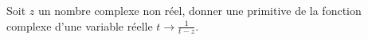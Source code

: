 Soit $z$ un nombre complexe non r{\'e}el, donner une primitive de la fonction complexe d'une variable r{\'e}elle $t\longrightarrow \frac{1}{t-z}$.\bigskip\bigskip